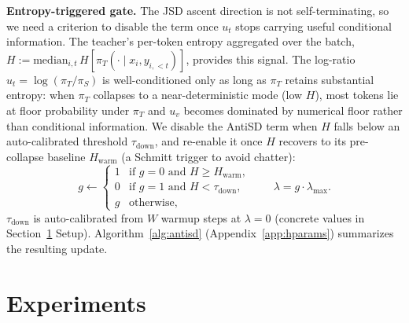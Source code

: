 \documentclass{llmxive}
\begin{document}
\textbf{Entropy-triggered gate.} The JSD ascent direction is not self-terminating, so we need a criterion to disable the term once $u_t$ stops carrying useful conditional information. The teacher's per-token entropy aggregated over the batch, $H := \mathrm{median}_{i,t}\, H[\pi_T(\cdot \mid x_i, y_{i,<t})]$, provides this signal. The log-ratio $u_t = \log(\pi_T/\pi_S)$ is well-conditioned only as long as $\pi_T$ retains substantial entropy: when $\pi_T$ collapses to a near-deterministic mode (low $H$), most tokens lie at floor probability under $\pi_T$ and $u_v$ becomes dominated by numerical floor rather than conditional information. We disable the AntiSD term when $H$ falls below an auto-calibrated threshold $\tau_{\mathrm{down}}$, and re-enable it once $H$ recovers to its pre-collapse baseline $H_{\mathrm{warm}}$ (a Schmitt trigger to avoid chatter):
\begin{equation}
  g \leftarrow
  \begin{cases}
    1 & \text{if } g=0 \text{ and } H \ge H_{\mathrm{warm}},  \\
    0 & \text{if } g=1 \text{ and } H < \tau_{\mathrm{down}}, \\
    g & \text{otherwise,}
  \end{cases}
  \qquad \lambda = g \cdot \lambda_{\max}.
\end{equation}
$\tau_{\mathrm{down}}$ is auto-calibrated from $W$ warmup steps at $\lambda=0$ (concrete values in Section~\ref{sec:exp} Setup). Algorithm~\ref{alg:antisd} (Appendix~\ref{app:hparams}) summarizes the resulting update.

\section{Experiments}
\label{sec:exp}
\vspace{-0.5em}

\end{document}
